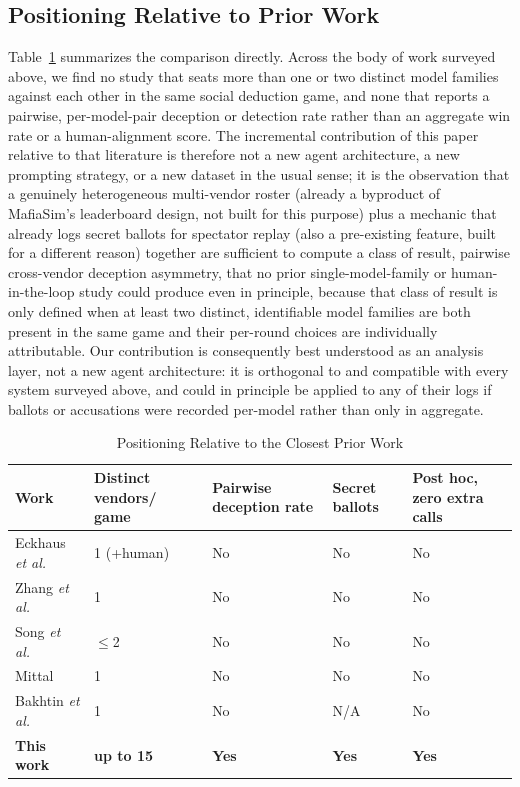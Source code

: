 \documentclass[10pt,conference]{IEEEtran}
\begin{document}
\subsection{Positioning Relative to Prior Work}

Table~\ref{tab:positioning} summarizes the comparison directly. Across the body of work surveyed above, we find no study that seats more than one or two distinct model families against each other in the same social deduction game, and none that reports a pairwise, per-model-pair deception or detection rate rather than an aggregate win rate or a human-alignment score. The incremental contribution of this paper relative to that literature is therefore not a new agent architecture, a new prompting strategy, or a new dataset in the usual sense; it is the observation that a genuinely heterogeneous multi-vendor roster (already a byproduct of MafiaSim's leaderboard design, not built for this purpose) plus a mechanic that already logs secret ballots for spectator replay (also a pre-existing feature, built for a different reason) together are sufficient to compute a class of result, pairwise cross-vendor deception asymmetry, that no prior single-model-family or human-in-the-loop study could produce even in principle, because that class of result is only defined when at least two distinct, identifiable model families are both present in the same game and their per-round choices are individually attributable. Our contribution is consequently best understood as an analysis layer, not a new agent architecture: it is orthogonal to and compatible with every system surveyed above, and could in principle be applied to any of their logs if ballots or accusations were recorded per-model rather than only in aggregate.

\begin{table}[t]
\centering
\caption{Positioning Relative to the Closest Prior Work}
\label{tab:positioning}
\small
\begin{tabular}{@{}p{1.7cm}p{1.15cm}p{1.05cm}p{1.15cm}p{1.15cm}@{}}
\toprule
Work & Distinct vendors/ game & Pairwise deception rate & Secret ballots & Post hoc, zero extra calls \\
\midrule
Eckhaus \textit{et al.} \cite{eckhaus2025time}     & 1 (+human) & No & No & No \\
Zhang \textit{et al.} \cite{zhang2025dvm}          & 1          & No & No & No \\
Song \textit{et al.} \cite{song2025beyond}         & $\leq$2    & No & No & No \\
Mittal \cite{mittal2026triadic}                    & 1          & No & No & No \\
Bakhtin \textit{et al.} \cite{bakhtin2022human}    & 1          & No & N/A & No \\
\textbf{This work}                                 & \textbf{up to 15} & \textbf{Yes} & \textbf{Yes} & \textbf{Yes} \\
\bottomrule
\end{tabular}
\end{table}
\end{document}
